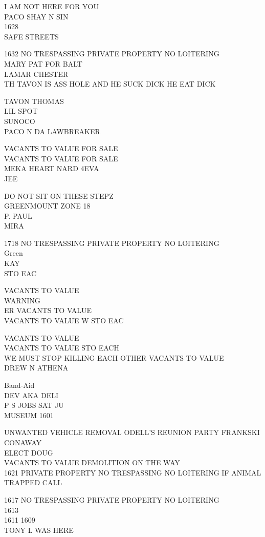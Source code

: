 \documentclass[10pt,letterpaper]{article}
\begin{document}
I AM NOT HERE FOR YOU\\
PACO SHAY N SIN\\
1628\\
SAFE STREETS

1632 NO TRESPASSING PRIVATE PROPERTY NO LOITERING\\
MARY PAT FOR BALT\\
LAMAR CHESTER\\
TH TAVON IS ASS HOLE AND HE SUCK DICK HE EAT DICK

TAVON THOMAS\\
LIL SPOT\\
SUNOCO\\
PACO N DA LAWBREAKER

VACANTS TO VALUE FOR SALE\\
VACANTS TO VALUE FOR SALE\\
MEKA HEART NARD 4EVA\\
JEE

DO NOT SIT ON THESE STEPZ\\
GREENMOUNT ZONE 18\\
P. PAUL\\
MIRA

1718 NO TRESPASSING PRIVATE PROPERTY NO LOITERING\\
Green\\
KAY\\
STO EAC

VACANTS TO VALUE\\
WARNING\\
ER VACANTS TO VALUE\\
VACANTS TO VALUE W STO EAC

VACANTS TO VALUE\\
VACANTS TO VALUE STO EACH\\
WE MUST STOP KILLING EACH OTHER VACANTS TO VALUE\\
DREW N ATHENA

Band{-}Aid\\
DEV AKA DELI\\
P S JOBS SAT JU\\
MUSEUM 1601

UNWANTED VEHICLE REMOVAL ODELL'S REUNION PARTY FRANKSKI CONAWAY\\
ELECT DOUG\\
VACANTS TO VALUE DEMOLITION ON THE WAY\\
1621 PRIVATE PROPERTY NO TRESPASSING NO LOITERING IF ANIMAL TRAPPED CALL

1617 NO TRESPASSING PRIVATE PROPERTY NO LOITERING\\
1613\\
1611 1609\\
TONY L WAS HERE
\end{document}
